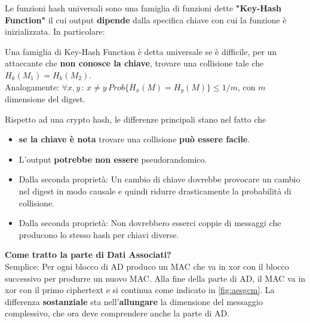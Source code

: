 Le funzioni hash universali sono una famiglia di funzioni dette \textbf{"Key-Hash Function"} il cui output \textbf{dipende} dalla specifica chiave con cui la funzione è inizializzata. In particolare:
\begin{definition}
Una famiglia di Key-Hash Function è detta universale se è difficile, per un attaccante che \textbf{non conosce la chiave}, trovare una collisione tale che $H_k(M_1)=H_k(M_2)$.\\
Analogamente: $\forall{x,y}\,:\,x\ne{y}\, Prob\{H_x(M)=H_y(M)\}\leq{1/m}$, con $m$ dimensione del digest. 
\end{definition}
Rispetto ad una crypto hash, le differenze principali stano nel fatto che 
\begin{itemize}
    \item \textbf{se la chiave è nota} trovare una collisione  \textbf{può essere facile}.
    \item L'output \textbf{potrebbe non essere} pseudorandomico.
    \item Dalla seconda proprietà: Un cambio di chiave dovrebbe provocare un cambio nel digest in modo causale e quindi ridurre drasticamente la probabilità di collisione.
    \item Dalla seconda proprietà: Non dovrebbero esserci coppie di messaggi che producono lo stesso hash per chiavi diverse. 
\end{itemize}\pagebreak
\begin{note}\textbf{Come tratto la parte di Dati Associati?}\hfill\\
Semplice: Per ogni blocco di AD produco un MAC che va in xor con il blocco successivo per produrre un nuovo MAC. Alla fine della parte di AD, il MAC va in xor con il primo ciphertext e si continua come indicato in \cref{fig:aesgcm}. La differenza \textbf{sostanziale} sta nell'\textbf{allungare} la dimensione del messaggio complessivo, che ora deve comprendere anche la parte di AD.
\end{note}
